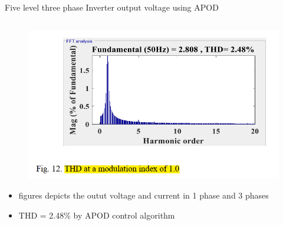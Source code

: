 \documentclass[
	11pt, %
]{beamer}
\begin{document}
\begin{frame}{Five level three phase Inverter output voltage using APOD}
\begin{columns}
\begin{column}{0.5\textwidth}
\begin{figure}
			\includegraphics[width=1\linewidth]{APOD_THD.png}
		\end{figure}
		\begin{itemize}
			\scriptsize
			\item {figures depicts the outut voltage and current in 1 phase and 3 phases}
			\item {THD = 2.48\% by APOD control algorithm}
		\end{itemize}
	\end{column}
	\end{columns}
\end{frame}
\end{document}
